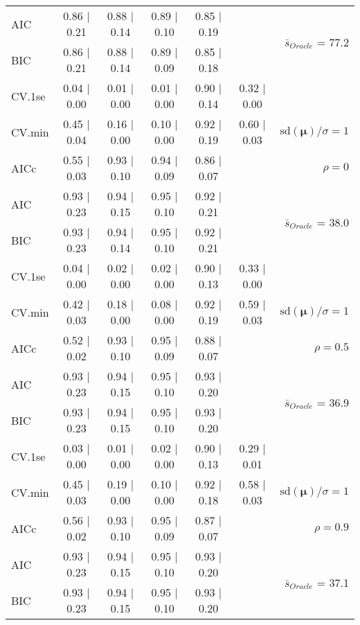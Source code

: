 \begin{table}
\begin{center}
\begin{tabular}{l*{5}{c}|r}
AIC & 0.86 $\mid$ 0.21 & 0.88 $\mid$ 0.14 & 0.89 $\mid$ 0.10 & 0.85 $\mid$ 0.19 & &  \multirow{2}{*}{$\bar{s}_{Oracle}$ = 77.2} \\
BIC & 0.86 $\mid$ 0.21 & 0.88 $\mid$ 0.14 & 0.89 $\mid$ 0.09 & 0.85 $\mid$ 0.18 & &  \\
 \hline 
CV.1se & 0.04 $\mid$ 0.00 & 0.01 $\mid$ 0.00 & 0.01 $\mid$ 0.00 & 0.90 $\mid$ 0.14 & 0.32 $\mid$ 0.00 & \\
CV.min & 0.45 $\mid$ 0.04 & 0.16 $\mid$ 0.00 & 0.10 $\mid$ 0.00 & 0.92 $\mid$ 0.19 & 0.60 $\mid$ 0.03 &  $\mathrm{sd}(\mathbf{\mu})/\sigma=1$ \\
AICc & 0.55 $\mid$ 0.03 & 0.93 $\mid$ 0.10 & 0.94 $\mid$ 0.09 & 0.86 $\mid$ 0.07 & & $\rho=0$ \\
AIC & 0.93 $\mid$ 0.23 & 0.94 $\mid$ 0.15 & 0.95 $\mid$ 0.10 & 0.92 $\mid$ 0.21 & &  \multirow{2}{*}{$\bar{s}_{Oracle}$ = 38.0} \\
BIC & 0.93 $\mid$ 0.23 & 0.94 $\mid$ 0.14 & 0.95 $\mid$ 0.10 & 0.92 $\mid$ 0.21 & &  \\
 \hline 
CV.1se & 0.04 $\mid$ 0.00 & 0.02 $\mid$ 0.00 & 0.02 $\mid$ 0.00 & 0.90 $\mid$ 0.13 & 0.33 $\mid$ 0.00 & \\
CV.min & 0.42 $\mid$ 0.03 & 0.18 $\mid$ 0.00 & 0.08 $\mid$ 0.00 & 0.92 $\mid$ 0.19 & 0.59 $\mid$ 0.03 &  $\mathrm{sd}(\mathbf{\mu})/\sigma=1$ \\
AICc & 0.52 $\mid$ 0.02 & 0.93 $\mid$ 0.10 & 0.95 $\mid$ 0.09 & 0.88 $\mid$ 0.07 & & $\rho=0.5$ \\
AIC & 0.93 $\mid$ 0.23 & 0.94 $\mid$ 0.15 & 0.95 $\mid$ 0.10 & 0.93 $\mid$ 0.20 & &  \multirow{2}{*}{$\bar{s}_{Oracle}$ = 36.9} \\
BIC & 0.93 $\mid$ 0.23 & 0.94 $\mid$ 0.15 & 0.95 $\mid$ 0.10 & 0.93 $\mid$ 0.20 & &  \\
 \hline 
CV.1se & 0.03 $\mid$ 0.00 & 0.01 $\mid$ 0.00 & 0.02 $\mid$ 0.00 & 0.90 $\mid$ 0.13 & 0.29 $\mid$ 0.01 & \\
CV.min & 0.45 $\mid$ 0.03 & 0.19 $\mid$ 0.00 & 0.10 $\mid$ 0.00 & 0.92 $\mid$ 0.18 & 0.58 $\mid$ 0.03 &  $\mathrm{sd}(\mathbf{\mu})/\sigma=1$ \\
AICc & 0.56 $\mid$ 0.02 & 0.93 $\mid$ 0.10 & 0.95 $\mid$ 0.09 & 0.87 $\mid$ 0.07 & & $\rho=0.9$ \\
AIC & 0.93 $\mid$ 0.23 & 0.94 $\mid$ 0.15 & 0.95 $\mid$ 0.10 & 0.93 $\mid$ 0.20 & &  \multirow{2}{*}{$\bar{s}_{Oracle}$ = 37.1} \\
BIC & 0.93 $\mid$ 0.23 & 0.94 $\mid$ 0.15 & 0.95 $\mid$ 0.10 & 0.93 $\mid$ 0.20 & &  \\

\end{tabular}
\end{center}
\end{table}
